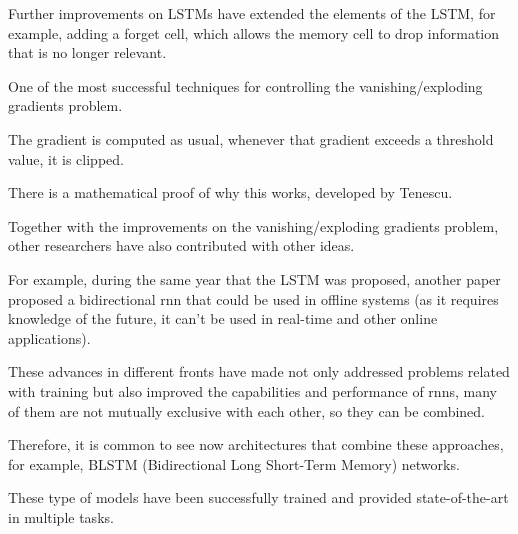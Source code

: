 Further improvements on LSTMs have extended the elements
of the LSTM, for example, adding a forget cell, which
allows the memory cell to drop information that is no
longer relevant.

 One of the most successful techniques for
controlling the vanishing/exploding gradients problem.

The gradient is computed as usual, whenever that gradient
exceeds a threshold value, it is clipped.

There is a mathematical proof of why this works, developed
by Tenescu.

 Together with the improvements on the
vanishing/exploding gradients problem, other researchers
have also contributed with other ideas.

For example, during the same year that the LSTM was
proposed, another paper proposed a bidirectional \gls{rnn} that
could be used in offline systems (as it requires knowledge
of the future, it can’t be used in real-time and other
online applications).

These advances in different fronts have made not only
addressed problems related with training but also improved
the capabilities and performance of \glspl{rnn}, many of them are
not mutually exclusive with each other, so they can be
combined.

Therefore, it is common to see now architectures that
combine these approaches, for example, BLSTM
(Bidirectional Long Short-Term Memory) networks.

These type of models have been successfully trained and
provided state-of-the-art in multiple tasks.

